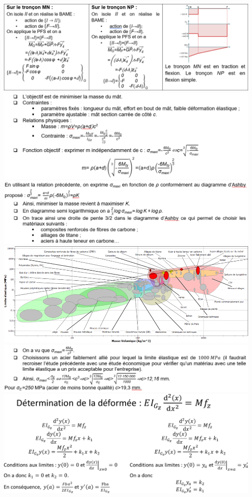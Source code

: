\documentclass[10pt,fleqn]{article} %
\begin{document}
\newpage
\begin{center}
\includegraphics[width=\linewidth]{images/cor_01}
\includegraphics[width=\linewidth]{images/cor_02}
\includegraphics[width=\linewidth]{images/cor_03}
\includegraphics[width=\linewidth]{images/cor_04}
\includegraphics[width=\linewidth]{images/cor_05}
\includegraphics[width=\linewidth]{images/cor_06}
\end{center}

\begin{center}

\end{center}
\end{document}
